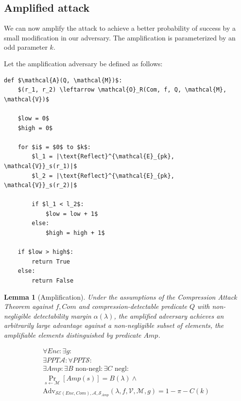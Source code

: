 \documentclass[conference, letterpaper, 10pt]{IEEEtran}
\newtheorem{lemma}{Lemma}
\begin{document}
\subsection{Amplified attack}

We can now amplify the attack to achieve a better probability of success by a small modification in our adversary.
The amplification is parameterized by an odd parameter $k$.

Let the amplification adversary be defined as follows:

\begin{lstlisting}[texcl,mathescape]
def $\mathcal{A}(Q, \mathcal{M})$:
    $(r_1, r_2) \leftarrow \mathcal{O}_R(Com, f, Q, \mathcal{M}, \mathcal{V})$

    $low = 0$
    $high = 0$

    for $i$ = $0$ to $k$:
        $l_1 = |\text{Reflect}^{\mathcal{E}_{pk}, \mathcal{V}}_s(r_1)|$
        $l_2 = |\text{Reflect}^{\mathcal{E}_{pk}, \mathcal{V}}_s(r_2)|$

        if $l_1 < l_2$:
            $low = low + 1$
        else:
            $high = high + 1$

    if $low > high$:
        return True
    else:
        return False
\end{lstlisting}

\begin{lemma}[Amplification]

Under the assumptions of the Compression Attack Theorem against $f, Com$
and compression-detectable predicate $Q$ with non-negligible
detectability margin $\alpha(\lambda)$,
the amplified adversary achieves an arbitrarily large advantage
against a non-negligible subset of elements, the
\textit{amplifiable elements} distinguished by predicate $Amp$.

\begin{align*}
    \forall Enc:
    \exists g:\\
    \exists PPT \mathcal{A}:
    \forall PPT \mathcal{S}:\\
    \exists Amp:
    \exists B \text{ non-negl}:
    \exists C \text{ negl}:\\
    \Pr_{s \leftarrow \mathcal{M}}[Amp(s)] = B(\lambda) \land\\
    \text{Adv}_{\mathcal{SE}(Enc, Com), \mathcal{A}, \mathcal{S}_{Amp}}
    (\lambda, f, \mathcal{V}, \mathcal{M}, g) = 1 - \pi - C(k)
\end{align*}

\end{lemma}
\end{document}
